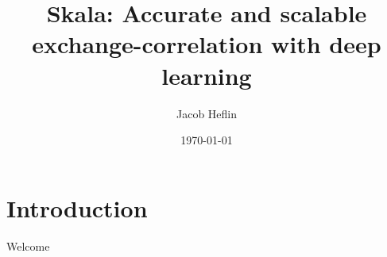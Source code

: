 \documentclass{beamer}
\title{Skala: Accurate and scalable exchange-correlation with deep learning}
\author{Jacob Heflin}
\date{\today}
\begin{document}
\frame{\titlepage}

\section{Introduction}

\begin{frame}{Welcome}

\end{frame}
\end{document}

